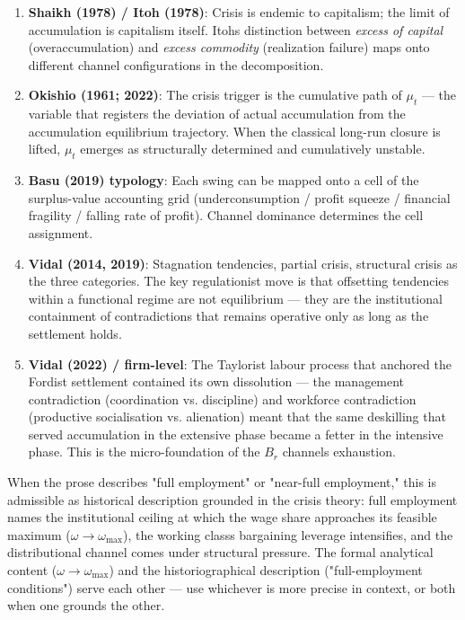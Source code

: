 \begin{enumerate}
\def\labelenumi{\arabic{enumi}.}
\item
  \textbf{Shaikh (1978) / Itoh (1978)}: Crisis is endemic to capitalism;
  the limit of accumulation is capitalism itself. Itoh\textquotesingle s
  distinction between \emph{excess of capital} (overaccumulation) and
  \emph{excess commodity} (realization failure) maps onto different
  channel configurations in the decomposition.
\item
  \textbf{Okishio (1961; 2022)}: The crisis trigger is the cumulative
  path of \(\mu_t\) --- the variable that registers the deviation of
  actual accumulation from the accumulation equilibrium trajectory. When
  the classical long-run closure is lifted, \(\mu_t\) emerges as
  structurally determined and cumulatively unstable.
\item
  \textbf{Basu (2019) typology}: Each swing can be mapped onto a cell of
  the surplus-value accounting grid (underconsumption / profit squeeze /
  financial fragility / falling rate of profit). Channel dominance
  determines the cell assignment.
\item
  \textbf{Vidal (2014, 2019)}: Stagnation tendencies, partial crisis,
  structural crisis as the three categories. The key regulationist move
  is that offsetting tendencies within a functional regime are not
  equilibrium --- they are the institutional containment of
  contradictions that remains operative only as long as the settlement
  holds.
\item
  \textbf{Vidal (2022) / firm-level}: The Taylorist labour process that
  anchored the Fordist settlement contained its own dissolution --- the
  management contradiction (coordination vs. discipline) and workforce
  contradiction (productive socialisation vs. alienation) meant that the
  same deskilling that served accumulation in the extensive phase became
  a fetter in the intensive phase. This is the micro-foundation of the
  \(B_r\) channel\textquotesingle s exhaustion.
\end{enumerate}

When the prose describes "full employment" or "near-full employment,"
this is admissible as historical description grounded in the crisis
theory: full employment names the institutional ceiling at which the
wage share approaches its feasible maximum
(\(\omega \to \omega_{\max}\)), the working class\textquotesingle s
bargaining leverage intensifies, and the distributional channel comes
under structural pressure. The formal analytical content
(\(\omega \to \omega_{\max}\)) and the historiographical description
("full-employment conditions") serve each other --- use whichever is
more precise in context, or both when one grounds the other.

